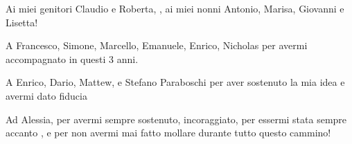 \begin{flushright}
Ai miei genitori Claudio e Roberta, , ai miei nonni Antonio, Marisa, Giovanni e Lisetta!

\bigskip

A Francesco, Simone, Marcello, Emanuele, Enrico, Nicholas per avermi accompagnato in questi 3 anni.

\bigskip

A Enrico, Dario, Mattew, e Stefano Paraboschi per aver sostenuto la mia idea e avermi dato fiducia

\bigskip

Ad Alessia, per avermi sempre sostenuto, incoraggiato, per essermi stata sempre accanto , e per non avermi mai fatto mollare durante tutto questo cammino! 


\end{flushright}